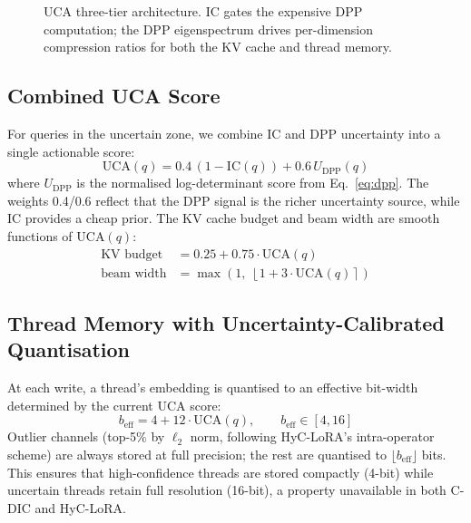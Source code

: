 \documentclass[11pt, a4paper]{article}
\newcommand{\IC}{\mathrm{IC}}
\newcommand{\UCA}{\mathrm{UCA}}
\begin{document}
\begin{figure}[h]
\caption{UCA three-tier architecture. IC gates the expensive DPP computation; the DPP eigenspectrum drives per-dimension compression ratios for both the KV cache and thread memory.}
\label{fig:arch}
\end{figure}

\subsection{Combined UCA Score}

For queries in the uncertain zone, we combine IC and DPP uncertainty into a single actionable score:
\begin{equation}
\UCA(q) = 0.4\,(1-\IC(q)) + 0.6\,U_{\text{DPP}}(q)
\label{eq:uca}
\end{equation}
where $U_{\text{DPP}}$ is the normalised log-determinant score from Eq.~\eqref{eq:dpp}. The weights 0.4/0.6 reflect that the DPP signal is the richer uncertainty source, while IC provides a cheap prior. The KV cache budget and beam width are smooth functions of $\UCA(q)$:
\begin{align}
\text{KV budget} &= 0.25 + 0.75\cdot\UCA(q) \label{eq:kv}\\
\text{beam width} &= \max\!\left(1,\;\left\lfloor 1 + 3\cdot\UCA(q)\right\rceil\right) \label{eq:beam}
\end{align}

\subsection{Thread Memory with Uncertainty-Calibrated Quantisation}

At each write, a thread's embedding is quantised to an effective bit-width determined by the current UCA score:
\begin{equation}
b_{\text{eff}} = 4 + 12\cdot\UCA(q),\qquad b_{\text{eff}} \in [4, 16]
\label{eq:bits}
\end{equation}
Outlier channels (top-5\% by $\ell_2$ norm, following HyC-LoRA's intra-operator scheme) are always stored at full precision; the rest are quantised to $\lfloor b_{\text{eff}}\rfloor$ bits. This ensures that high-confidence threads are stored compactly (4-bit) while uncertain threads retain full resolution (16-bit), a property unavailable in both C-DIC and HyC-LoRA.
\end{document}
